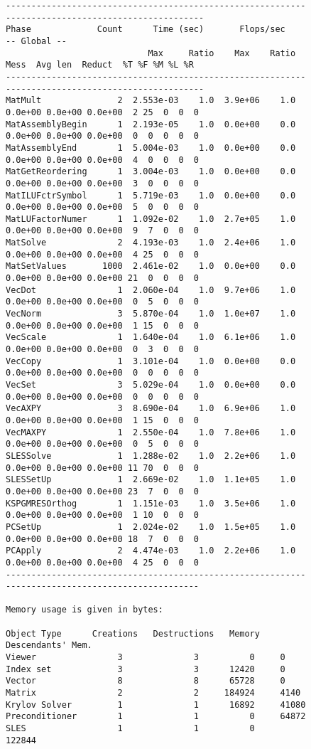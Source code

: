 {\begin{figure}[H]
{\begin{verbatim}
--------------------------------------------------------------------------------------------------
Phase             Count      Time (sec)       Flops/sec                             -- Global --    
                            Max     Ratio    Max    Ratio   Mess  Avg len  Reduct  %T %F %M %L %R   
--------------------------------------------------------------------------------------------------
MatMult               2  2.553e-03    1.0  3.9e+06    1.0  0.0e+00 0.0e+00 0.0e+00  2 25  0  0  0
MatAssemblyBegin      1  2.193e-05    1.0  0.0e+00    0.0  0.0e+00 0.0e+00 0.0e+00  0  0  0  0  0
MatAssemblyEnd        1  5.004e-03    1.0  0.0e+00    0.0  0.0e+00 0.0e+00 0.0e+00  4  0  0  0  0
MatGetReordering      1  3.004e-03    1.0  0.0e+00    0.0  0.0e+00 0.0e+00 0.0e+00  3  0  0  0  0
MatILUFctrSymbol      1  5.719e-03    1.0  0.0e+00    0.0  0.0e+00 0.0e+00 0.0e+00  5  0  0  0  0
MatLUFactorNumer      1  1.092e-02    1.0  2.7e+05    1.0  0.0e+00 0.0e+00 0.0e+00  9  7  0  0  0
MatSolve              2  4.193e-03    1.0  2.4e+06    1.0  0.0e+00 0.0e+00 0.0e+00  4 25  0  0  0
MatSetValues       1000  2.461e-02    1.0  0.0e+00    0.0  0.0e+00 0.0e+00 0.0e+00 21  0  0  0  0
VecDot                1  2.060e-04    1.0  9.7e+06    1.0  0.0e+00 0.0e+00 0.0e+00  0  5  0  0  0
VecNorm               3  5.870e-04    1.0  1.0e+07    1.0  0.0e+00 0.0e+00 0.0e+00  1 15  0  0  0
VecScale              1  1.640e-04    1.0  6.1e+06    1.0  0.0e+00 0.0e+00 0.0e+00  0  3  0  0  0
VecCopy               1  3.101e-04    1.0  0.0e+00    0.0  0.0e+00 0.0e+00 0.0e+00  0  0  0  0  0
VecSet                3  5.029e-04    1.0  0.0e+00    0.0  0.0e+00 0.0e+00 0.0e+00  0  0  0  0  0
VecAXPY               3  8.690e-04    1.0  6.9e+06    1.0  0.0e+00 0.0e+00 0.0e+00  1 15  0  0  0
VecMAXPY              1  2.550e-04    1.0  7.8e+06    1.0  0.0e+00 0.0e+00 0.0e+00  0  5  0  0  0
SLESSolve             1  1.288e-02    1.0  2.2e+06    1.0  0.0e+00 0.0e+00 0.0e+00 11 70  0  0  0
SLESSetUp             1  2.669e-02    1.0  1.1e+05    1.0  0.0e+00 0.0e+00 0.0e+00 23  7  0  0  0
KSPGMRESOrthog        1  1.151e-03    1.0  3.5e+06    1.0  0.0e+00 0.0e+00 0.0e+00  1 10  0  0  0
PCSetUp               1  2.024e-02    1.0  1.5e+05    1.0  0.0e+00 0.0e+00 0.0e+00 18  7  0  0  0
PCApply               2  4.474e-03    1.0  2.2e+06    1.0  0.0e+00 0.0e+00 0.0e+00  4 25  0  0  0
-------------------------------------------------------------------------------------------------

Memory usage is given in bytes:

Object Type      Creations   Destructions   Memory  Descendants' Mem.
Viewer                3              3          0     0
Index set             3              3      12420     0
Vector                8              8      65728     0
Matrix                2              2     184924     4140
Krylov Solver         1              1      16892     41080
Preconditioner        1              1          0     64872
SLES                  1              1          0     122844


\end{verbatim}}
\end{figure}}

